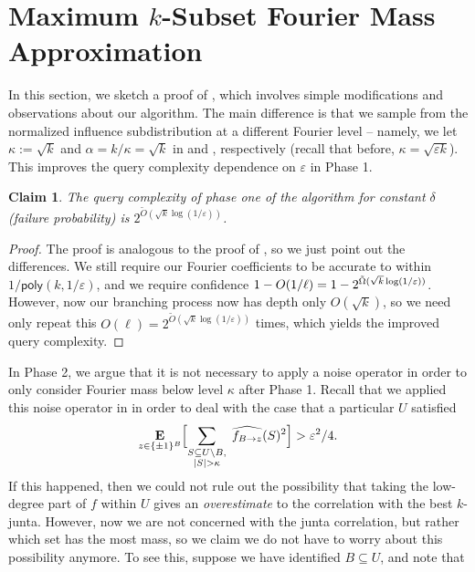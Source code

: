 \documentclass[10pt,a4paper]{article}
\providecommand{\poly}{\mathsf{poly}}
\theoremstyle{plain}
\newtheorem{claim}[theorem]{Claim}
\theoremstyle{remark}
\theoremstyle{plain}
\providecommand{\E}{}
\renewcommand{\E}{\mathop{\bf E\/}}
\newcommand{\bigbracket}[1]{\Bigl [ #1 \Bigr ]}
\newcommand{\eps}{\varepsilon}
\renewcommand{\hat}{\widehat}
\renewcommand{\tilde}{\widetilde}
\newcommand{\pmone}{\{\pm 1\}}
\newcommand{\fourierCutoff}{\kappa}
\newcommand{\branchProcessDepth}{\alpha}
\renewcommand{\epsilon}{\varepsilon}
\begin{document}
\section{Maximum $k$-Subset Fourier Mass Approximation}
\label{appendix:k-mass-estimation}
In this section, we sketch a proof of , which involves simple modifications and observations about our algorithm. The main difference is that we sample from the normalized influence subdistribution at a different Fourier level --  namely, we let $\fourierCutoff := \sqrt{k}$ and $\branchProcessDepth = k/\fourierCutoff = \sqrt{k}$ in  and , respectively (recall that before, $\fourierCutoff = \sqrt{\eps k}$). This improves the query complexity dependence on $\eps$ in Phase 1.
\begin{claim}
\label{claim:phase-one-mass-query-complexity}
The query complexity of phase one of the algorithm for constant $\delta$ (failure probability) is $2^{\tilde{O}(\sqrt{k}\log(1/\eps))}$.
\end{claim}
\begin{proof}
The proof is analogous to the proof of , so we just point out the differences. We still require our Fourier coefficients to be accurate to within $1/\poly(k,1/\eps)$, and we require confidence $1-O(1/\ell) =1 - 2^{\Tilde{\Omega}(\sqrt{k}\log(1/\eps))}$. However, now our branching process now has depth only $O(\sqrt{k})$, so we need only repeat this $O(\ell) = 2^{\tilde{O}(\sqrt{k}\log(1/\eps))}$ times, which yields the improved query complexity.
\end{proof}
In Phase 2, we argue that it is not necessary to apply a noise operator in order to only consider Fourier mass below level $\fourierCutoff$ after Phase 1. Recall that we applied this noise operator in  in order to deal with the case that a particular $U$ satisfied
\begin{equation}\label{eq:U conc appendix}
\E_{z\in \pmone^{B}}\bigbracket{\sum_{\substack{S \subseteq U \setminus B, \\ |S| > \fourierCutoff}} \;\hat{f_{B \to z}}(S)^2} >\epsilon^2/4.
\end{equation}
If this happened, then we could not rule out the possibility that taking the low-degree part of $f$ within $U$ gives an \textit{overestimate} to the correlation with the best $k$-junta. However, now we are not concerned with the junta correlation, but rather which set has the most mass, so we claim we do not have to worry about this possibility anymore. To see this, suppose we have identified $B \subseteq U$, and note that
\end{document}
